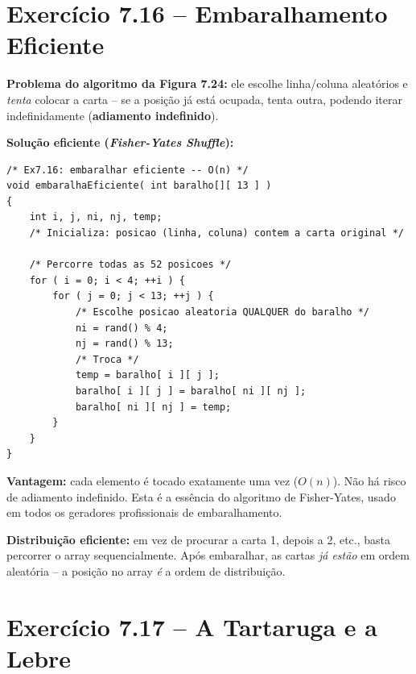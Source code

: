 \documentclass[12pt,a4paper]{article}
\begin{document}
\section{Exercício 7.16 -- Embaralhamento Eficiente}

\begin{respostabox}
\textbf{Problema do algoritmo da Figura 7.24:} ele escolhe linha/coluna aleatórios
e \textit{tenta} colocar a carta -- se a posição já está ocupada, tenta outra,
podendo iterar indefinidamente (\textbf{adiamento indefinido}).

\textbf{Solução eficiente (\textit{Fisher-Yates Shuffle}):}

\begin{lstlisting}
/* Ex7.16: embaralhar eficiente -- O(n) */
void embaralhaEficiente( int baralho[][ 13 ] )
{
    int i, j, ni, nj, temp;
    /* Inicializa: posicao (linha, coluna) contem a carta original */

    /* Percorre todas as 52 posicoes */
    for ( i = 0; i < 4; ++i ) {
        for ( j = 0; j < 13; ++j ) {
            /* Escolhe posicao aleatoria QUALQUER do baralho */
            ni = rand() % 4;
            nj = rand() % 13;
            /* Troca */
            temp = baralho[ i ][ j ];
            baralho[ i ][ j ] = baralho[ ni ][ nj ];
            baralho[ ni ][ nj ] = temp;
        }
    }
}
\end{lstlisting}

\textbf{Vantagem:} cada elemento é tocado exatamente uma vez ($O(n)$). Não há
risco de adiamento indefinido. Esta é a essência do algoritmo de Fisher-Yates,
usado em todos os geradores profissionais de embaralhamento.

\textbf{Distribuição eficiente:} em vez de procurar a carta 1, depois a 2, etc.,
basta percorrer o array sequencialmente. Após embaralhar, as cartas \textit{já estão}
em ordem aleatória -- a posição no array \textit{é} a ordem de distribuição.
\end{respostabox}

\newpage

\section{Exercício 7.17 -- A Tartaruga e a Lebre}
\end{document}
